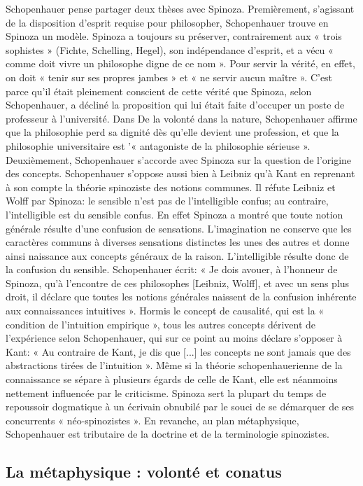 Schopenhauer pense partager deux thèses avec Spinoza. Premièrement, s’agissant de la disposition
d’esprit requise pour philosopher, Schopenhauer trouve en Spinoza un modèle. Spinoza a toujours su
préserver, contrairement aux « trois sophistes » (Fichte, Schelling, Hegel), son indépendance d’esprit, et a
vécu « comme doit vivre un philosophe digne de ce nom ». Pour servir la vérité, en effet, on doit « tenir sur
ses propres jambes » et « ne servir aucun maître ». C’est parce qu’il était pleinement conscient de cette vérité
que Spinoza, selon Schopenhauer, a décliné la proposition qui lui était faite d’occuper un poste de professeur
à l’université. Dans De la volonté dans la nature, Schopenhauer affirme que la
philosophie perd sa dignité dès qu’elle devient une profession, et que la philosophie universitaire est
’« antagoniste de la philosophie sérieuse ».
Deuxièmement, Schopenhauer s’accorde avec Spinoza sur la question de l’origine des concepts.
Schopenhauer s’oppose aussi bien à Leibniz qu’à Kant en reprenant à son compte la théorie spinoziste des
notions communes. Il réfute Leibniz et Wolff par Spinoza: le sensible n’est pas de l’intelligible confus; au
contraire, l’intelligible est du sensible confus. En effet Spinoza a montré que toute notion générale résulte
d’une confusion de sensations. L’imagination ne conserve que les caractères communs à diverses sensations
distinctes les unes des autres et donne ainsi naissance aux concepts généraux de la raison. L’intelligible
résulte donc de la confusion du sensible. Schopenhauer écrit: « Je dois avouer, à l’honneur de Spinoza, qu’à
l’encontre de ces philosophes [Leibniz, Wolff], et avec un sens plus droit, il déclare que toutes les notions
générales naissent de la confusion inhérente aux connaissances intuitives ».
Hormis le concept de causalité, qui est la « condition de l’intuition empirique », tous les
autres concepts dérivent de l’expérience selon Schopenhauer, qui sur ce point au moins déclare s’opposer à
Kant: « Au contraire de Kant, je dis que [...] les concepts ne sont jamais que des abstractions tirées de
l’intuition ».
Même si la théorie schopenhauerienne de la connaissance se sépare à plusieurs égards de celle de Kant,
elle est néanmoins nettement influencée par le criticisme. Spinoza sert la plupart du temps de repoussoir
dogmatique à un écrivain obnubilé par le souci de se démarquer de ses concurrents « néo-spinozistes ». En
revanche, au plan métaphysique, Schopenhauer est tributaire de la doctrine et de la terminologie
spinozistes.

\subsection{La métaphysique : volonté et conatus}

